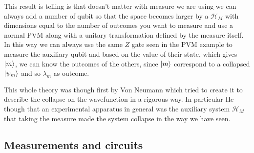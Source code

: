 \noindent
This result is telling is that doesn't matter with measure we are using we can always add a number of qubit so that the space becomes larger by a $\mathcal{H}_M$ with dimensions equal to the number of outcomes you want to measure and use a normal PVM along with a unitary transformation defined by the measure itself. In this way we can always use the same $Z$ gate seen in the PVM example to measure the auxiliary qubit and based on the value of their state, which gives $\ket{m}$, we can know the outcomes of the others, since $\ket{m}$ correspond to a collapsed $\ket{\psi_m}$ and so $\lambda_m$ as outcome.

\nt
{
    This whole theory was though first by Von Neumann which tried to create it to describe the collapse on the wavefunction in a rigorous way. In particular He though that an experimental apparatus in general was the auxiliary system $\mathcal{H}_M$ that taking the measure made the system collapse in the way we have seen.
}

\subsection{Measurements and circuits}

